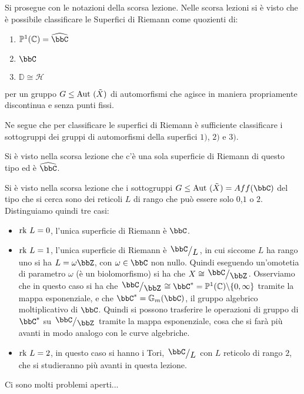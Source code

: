 Si prosegue con le notazioni della scorsa lezione.
Nelle scorsa lezioni si è visto che è possibile classificare le Superfici di Riemann come quozienti di:
\begin{enumerate}
\item $\mathbb{P}^1(\mathbb{C})=\hat{\bbC}$
\item $\bbC$
\item $\mathbb{D} \cong \mathcal{H}$
\end{enumerate}
per un gruppo $G\le\text{Aut }(\tilde{X})$ di automorfismi che agisce in maniera propriamente discontinua e senza punti fissi.

Ne segue che per classificare le superfici di Riemann è sufficiente classificare i sottogruppi dei gruppi di automorfismi della superfici $1)$, $2)$ e $3)$.

 Si è visto nella scorsa lezione che c'è una sola superficie di Riemann di questo tipo ed è $\hat{\bbC}$.

 Si è visto nella scorsa lezione che i sottogruppi $G\le\Aut(\tilde{X})=Aff(\bbC)$ del tipo che si cerca sono dei reticoli $L$ di rango che può essere solo $0$,$1$ o $2$. Distinguiamo quindi tre casi:
\begin{itemize}
\item $\mbox{rk } L=0$, l'unica superficie di Riemann è $\bbC$.
\item $\mbox{rk } L=1$, l'unica superficie di Riemann è $\quotient{\bbC}{L}$, in cui siccome $L$ ha rango uno si ha $L=\omega \bbZ$, con $\omega\in\bbC$ non nullo. Quindi eseguendo un'omotetia di parametro $\omega$ (è un biolomorfismo) si ha che $X\cong \quotient{\bbC}{\bbZ}$.
Osserviamo che in questo caso si ha che $\quotient{\bbC}{\bbZ}\cong \bbC^{*}=\mathbb{P}^1(\mathbb{C})\minus\{0,\infty\}$ tramite la mappa esponenziale, e che $\bbC^{*}=\mathbb{G}_m(\bbC)$, il gruppo algebrico moltiplicativo di $\bbC$. Quindi si possono trasferire le operazioni di gruppo di $\bbC^{*}$ su $\quotient{\bbC}{\bbZ}$ tramite la mappa esponenziale, cosa che si farà più avanti in modo analogo con le curve algebriche.
\item $\mbox{rk } L=2$, in questo caso si hanno i Tori, $\quotient{\bbC}{L}$ con $L$ reticolo di rango $2$, che si studieranno più avanti in questa lezione.
\end{itemize}
 Ci sono molti problemi aperti...


